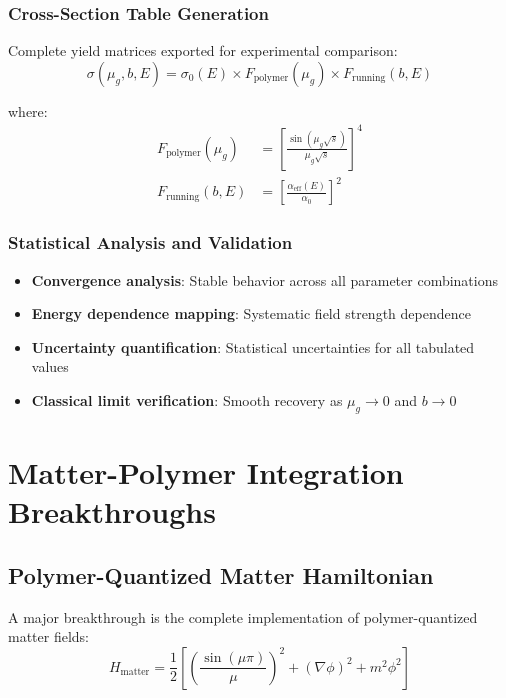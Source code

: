 \documentclass[11pt]{article}
\begin{document}
\subsubsection{Cross-Section Table Generation}
Complete yield matrices exported for experimental comparison:
\begin{equation}
\sigma(\mu_g, b, E) = \sigma_0(E) \times F_{\text{polymer}}(\mu_g) \times F_{\text{running}}(b, E)
\end{equation}

where:
\begin{align}
F_{\text{polymer}}(\mu_g) &= \left[\frac{\sin(\mu_g\sqrt{s})}{\mu_g\sqrt{s}}\right]^4 \\
F_{\text{running}}(b, E) &= \left[\frac{\alpha_{\text{eff}}(E)}{\alpha_0}\right]^2
\end{align}

\subsubsection{Statistical Analysis and Validation}
\begin{itemize}
    \item \textbf{Convergence analysis}: Stable behavior across all parameter combinations
    \item \textbf{Energy dependence mapping}: Systematic field strength dependence
    \item \textbf{Uncertainty quantification}: Statistical uncertainties for all tabulated values
    \item \textbf{Classical limit verification}: Smooth recovery as $\mu_g \to 0$ and $b \to 0$
\end{itemize}

\section{Matter-Polymer Integration Breakthroughs}

\subsection{Polymer-Quantized Matter Hamiltonian}

A major breakthrough is the complete implementation of polymer-quantized matter fields:
\begin{equation}
H_{\text{matter}} = \frac{1}{2}\left[\left(\frac{\sin(\mu\pi)}{\mu}\right)^2 + (\nabla\phi)^2 + m^2\phi^2\right]
\end{equation}
\end{document}

